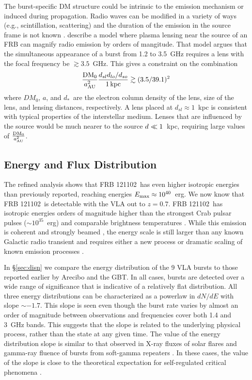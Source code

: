\documentclass[twocolumn]{aastex61}
\newcommand{\frb}{FRB 121102}
\begin{document}
The burst-specific DM structure could be intrinsic to the emission mechanism or induced during propagation. Radio waves can be modified in a variety of ways (e.g., scintillation, scattering) and the duration of the emission in the source frame is not known \citep{2016arXiv160505890C}. \citet{CORDES} describe a model where plasma lensing near the source of an FRB can magnify radio emission by orders of mangitude. That model argues that the simultaneous appearance of a burst from 1.2 to 3.5~GHz requires a lens with the focal frequency be $\gtrsim 3.5$~GHz. This gives a constraint on the combination 
$$\frac{\rm DM_0}{a_{\rm AU}^2} \frac{d_{sl}d_{lo}/d_{so}}{1\, \rm kpc} \gtrsim (3.5 / 39.1)^2$$
where $DM_0$, $a$, and $d_*$\ are the electron column density of the lens, size of the lens, and lensing distances, respectively. A lens placed at $d_{sl}\approx1$~kpc is consistent with typical properties of the interstellar medium. Lenses that are influenced by the source would be much nearer to the source $d_{\sl} \ll 1$~kpc, requiring large values of $\frac{\rm DM_0}{a_{\rm AU}^2}$.

\subsection{Energy and Flux Distribution}
The refined analysis shows that \frb\ has even higher isotropic energies than previously reported, reaching energies $E_{\rm{max}}\approx10^{40}$\ erg. We now know that \frb\ is detectable with the VLA out to $z=0.7$. \frb\ has isotropic energies orders of magnitude higher than the strongest Crab pulsar pulses ($\sim10^{35}$~erg) and comparable brightness temperatures \citep[$T_b^{\rm{Crab}}\sim10^{41}$~K versus $T_b^{\rm{FRB 121102}}\sim10^{38}$~K;][]{2003Natur.422..141H,2014PhRvD..89j3009K}. While this emission is coherent and strongly beamed \citep{2016Natur.531..202S, WEIRD}, the energy scale is still larger than any known Galactic radio transient and requires either a new process or dramatic scaling of known emission processes \citep{2016MNRAS.462..941L, 2016MNRAS.457..232C}.

In \S \ref{sec:disn} we compare the energy distribution of the 9 VLA bursts to those reported earlier by Arecibo and the GBT. In all cases, bursts are detected over a wide range of significance that is indicative of a relatively flat distribution. All three energy distributions can be characterized as a powerlaw in $dN/dE$ with slope $\sim-1.7$. This slope is seen even though the burst rate varies by almost an order of magnitude between observations and frequencies cover both 1.4 and 3~GHz bands. This suggests that the slope is related to the underlying physical process, rather than the state at any given time. The value of the energy distribution slope is similar to that observed in X-ray fluxes of solar flares \citep{2011SoPh..274...99A} and gamma-ray fluence of bursts from soft-gamma repeaters \citep{2000ApJ...532L.121G, 2011ApJ...739...94S}. In these cases, the value of the slope is close to the theoretical expectation for self-regulated critical phenomena \citep[slope$=-5/3$;][]{2011SoPh..274...99A}.
\end{document}

